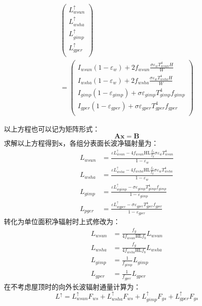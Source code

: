 \begin{landscape}
\begin{equation}
\begin{aligned}
\left(\begin{matrix}L_{wsun}^\uparrow\\L_{wsha}^\uparrow\\L_{gimp}^\uparrow\\L_{gper}^\uparrow\\\end{matrix}\right)\\
=\left(\begin{matrix}I_{wsun}\left(1-\varepsilon_w\right)+2f_{wsun}\frac{\sigma\varepsilon_wT_{wsun}^4H}{W}\\I_{wsha}\left(1-\varepsilon_w\right)+2f_{wsha}\frac{\sigma\varepsilon_wT_{wsha}^4H}{W}\\I_{gimp}\left(1-\varepsilon_{gimp}\right)+\sigma\varepsilon_{gimp}T_{gimp}^4f_{gimp}\\I_{gper}\left(1-\varepsilon_{gper}\right)+\sigma\varepsilon_{gper}T_{gper}^4f_{gper}\\\end{matrix}\right)
\end{aligned}
\end{equation}
\end{landscape}

以上方程也可以记为矩阵形式：
\begin{equation}
\mathbf{A x}=\mathbf{B}
\end{equation}
求解以上方程得到$\mathbf{x}$，各组分表面长波净辐射量为：
\begin{equation}\label{L_wsun_wsha_gimp_pger_1}
\begin{aligned}
L_{wsun} &=\frac{\varepsilon L_{wsun}^{\uparrow}-4 f_{wsun} \mathrm{HL} \frac{f_{b}}{f_{g}} \sigma \varepsilon_{w} T_{wsun}^{4}}{1-\varepsilon_{w}} \\ L_{wsha} &=\frac{\varepsilon L_{wsha}^{\uparrow}-4 f_{wsha} \mathrm{HL} \frac{f_{b}}{f_{g}} \sigma \varepsilon_{w} T_{wsha}^{4}}{1-\varepsilon_{w}} \\ L_{gimp} &=\frac{\varepsilon L_{w gimp}^{\uparrow}-\sigma \varepsilon_{gimp} T_{gimp}^{4} f_{gimp}}{1-\varepsilon_{gimp}} \\ L_{p g e r} &=\frac{\varepsilon L_{w gper}^{\uparrow}-\sigma \varepsilon_{gper} T_{gper}^{4} f_{gper}}{1-\varepsilon_{gper}}
\end{aligned}
\end{equation}
转化为单位面积净辐射时上式修改为：
\begin{equation}\label{L_wsun_wsha_gimp_pger_2}
\begin{aligned}
L_{wsun} &=\frac{f_{g}}{4 f_{wsun} \mathrm{HL} f_{b}} L_{wsun} \\ L_{wsha} &=\frac{f_{g}}{4 f_{wsha} \mathrm{HL} f_{b}} L_{wsha} \\ L_{gimp} &=\frac{1}{f_{gimp}} L_{gimp} \\ L_{gper} &=\frac{1}{f_{gper}} L_{gper}
\end{aligned}
\end{equation}
在不考虑屋顶时的向外长波辐射通量计算为：
\begin{equation}
L^{\uparrow}=L_{wsun}^{\uparrow} F_{ws}+L_{wsha}^{\uparrow} F_{ws}+L_{gimp}^{\uparrow} F_{gs}+L_{gper}^{\uparrow} F_{gs}
\end{equation}


